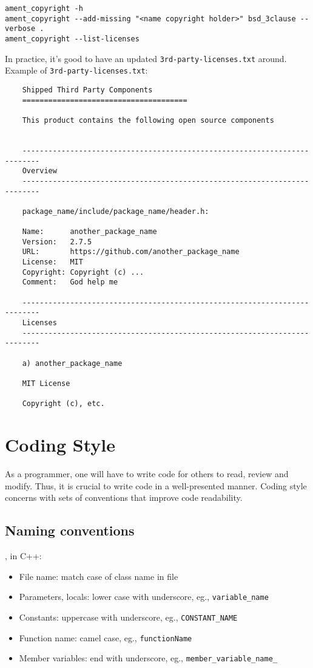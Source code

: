 \begin{verbatim}
ament_copyright -h
ament_copyright --add-missing "<name copyright holder>" bsd_3clause --verbose .
ament_copyright --list-licenses
\end{verbatim}

In practice, it's good to have an updated \texttt{3rd-party-licenses.txt} around. Example of \texttt{3rd-party-licenses.txt}:

\begin{verbatim}
	Shipped Third Party Components
	======================================
	
	This product contains the following open source components
	
	
	--------------------------------------------------------------------------
	Overview
	--------------------------------------------------------------------------
	
	package_name/include/package_name/header.h:
	
	Name:      another_package_name
	Version:   2.7.5
	URL:       https://github.com/another_package_name
	License:   MIT
	Copyright: Copyright (c) ...
	Comment:   God help me
	
	--------------------------------------------------------------------------
	Licenses
	--------------------------------------------------------------------------
	
	a) another_package_name
	
	MIT License
	
	Copyright (c), etc.
\end{verbatim}


\section{Coding Style}
As a programmer, one will have to write code for others to read, review and modify. Thus, it is crucial to write code in a well-presented manner. Coding style concerns with sets of conventions that improve code readability.

\subsection{Naming conventions}
\Eg, in C++:
\begin{itemize}
	\setlength\itemsep{0em}
	\item File name: match case of class name in file
	\item Parameters, locals: lower case with underscore, eg., \verb|variable_name|
	\item Constants: uppercase with underscore, eg., \verb|CONSTANT_NAME|
	\item Function name: camel case, eg., \verb|functionName|
	\item Member variables: end with underscore, eg., \verb|member_variable_name_|
\end{itemize}

